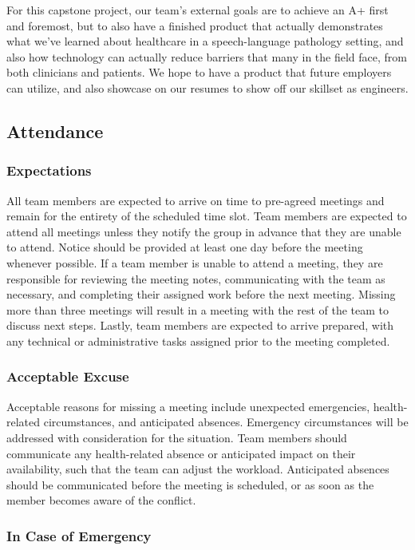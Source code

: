 \documentclass{article}
\begin{document}
For this capstone project, our team's external goals are to achieve an A+ first and foremost,
but to also have a finished product that actually demonstrates what we've learned about
healthcare in a speech-language pathology setting, and also how technology can actually 
reduce barriers that many in the field face, from both clinicians and patients. We hope
to have a product that future employers can utilize, and also showcase on our resumes
to show off our skillset as engineers.

\subsection*{Attendance}

\subsubsection*{Expectations}

All team members are expected to arrive on time to pre-agreed meetings and remain for the entirety of the scheduled time slot. 
Team members are expected to attend all meetings unless they notify the group in advance that they are unable to attend. 
Notice should be provided at least one day before the meeting whenever possible. 
If a team member is unable to attend a meeting, they are responsible for reviewing the meeting notes, 
communicating with the team as necessary, and completing their assigned work before the next meeting. Missing more than three meetings will result in a meeting with the rest of the team to discuss next steps. Lastly, team members are expected to arrive prepared, with any technical or administrative tasks assigned prior to the meeting completed.


\subsubsection*{Acceptable Excuse}

Acceptable reasons for missing a meeting include unexpected emergencies, 
health-related circumstances, and anticipated absences. Emergency circumstances 
will be addressed with consideration for the situation. 
Team members should communicate any health-related absence or anticipated impact on 
their availability, such that the team can adjust the workload. Anticipated absences 
should be communicated before the meeting is scheduled, or as soon as the member becomes aware of the conflict.

\subsubsection*{In Case of Emergency}
\end{document}
